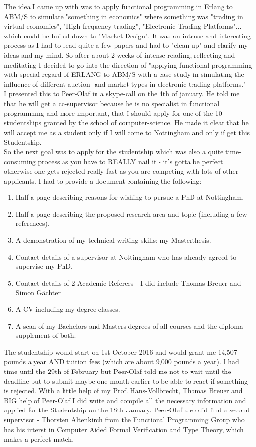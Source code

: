 The idea I came up with was to apply functional programming in Erlang to ABM/S to simulate "something in economics" where something was "trading in virtual economies", "High-frequency trading", "Electronic Trading Platforms"... which could be boiled down to "Market Design". It was an intense and interesting process as I had to read quite a few papers and had to "clean up" and clarify my ideas and my mind. So after about 2 weeks of intense reading, reflecting and meditating I decided to go into the direction of "applying functional programming with special regard of ERLANG to ABM/S with a case study in simulating the influence of different auction- and market types in electronic trading platforms." \\
I presented this to Peer-Olaf in a skype-call on the 4th of january. He told me that he will get a co-supervisor because he is no specialist in functional programming and more important, that I should apply for one of the 10 studentships granted by the school of computer-science. He made it clear that he will accept me as a student only if I will come to Nottingham and only if get this Studentship. \\
So the next goal was to apply for the studentship which was also a quite time-consuming process as you have to REALLY nail it - it's gotta be perfect otherwise one gets rejected really fast as you are competing with lots of other applicants. I had to provide a document containing the following:

\begin{enumerate}
\item Half a page describing reasons for wishing to pursue a PhD at Nottingham.
\item Half a page describing the proposed research area and topic (including a few references).
\item A demonstration of my technical writing skills: my Masterthesis.
\item Contact details of a supervisor at Nottingham who has already agreed to supervise my PhD.
\item Contact details of 2 Academic Referees - I did include Thomas Breuer and Simon Gächter
\item A CV including my degree classes.
\item A scan of my Bachelors and Masters degrees of all courses and the diploma supplement of both.
\end{enumerate}
      
The studentship would start on 1st October 2016 and would grant me 14,507 pounds a year AND tuition fees (which are about 9,000 pounds a year). I had time until the 29th of February but Peer-Olaf told me not to wait until the deadline but to submit maybe one month earlier to be able to react if something is rejected. 
With a little help of my Prof. Hans-Vollbrecht, Thomas Breuer and BIG help of Peer-Olaf I did write and compile all the necessary information and applied for the Studentship on the 18th January. Peer-Olaf also did find a second supervisor - Thorsten Altenkirch from the Functional Programming Group who has his interst in Computer Aided Formal Verification and Type Theory, which makes a perfect match. \\

